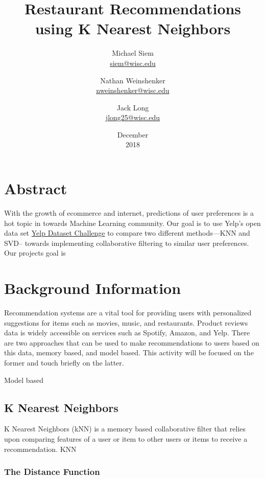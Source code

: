 \documentclass{report}
\title{Restaurant Recommendations using K Nearest Neighbors}
\date{December\\ 2018}
\author{Michael Siem \\ \href{mailto:siem@wisc.edu}{siem@wisc.edu}
	\and Nathan Weinshenker \\ \href{mailto:nweinshenker@wisc.edu}{nweinshenker@wisc.edu}
	\and Jack Long \\ \href{mailto:jlong25@wisc.edu}{jlong25@wisc.edu}}
\begin{document}
\maketitle

\section*{Abstract}
With the growth of ecommerce and internet, predictions of user preferences is a hot topic in towards Machine Learning community. Our goal is to use Yelp's open data set \href {https://www.yelp.com/dataset/challenge} {Yelp Dataset Challenge} to compare two different methods—KNN and SVD-- towards implementing collaborative filtering to similar user preferences.  Our projects goal is 


\section*{Background Information}

Recommendation systems are a vital tool for providing users with personalized suggestions for items such as movies, music, and restaurants.
Product reviews data is widely accessible on services such as Spotify, Amazon, and Yelp.
There are two approaches that can be used to make recommendations to users based on this data, memory based, and model based. This activity will be focused on the former and touch briefly on the latter.

Model based 
	
\subsection*{K Nearest Neighbors}
	
K Nearest Neighbors (kNN) is a memory based collaborative filter that relies upon comparing features of a user or item to other users or items to receive a recommendation. 
KNN 

\subsubsection*{The Distance Function}
\end{document}
